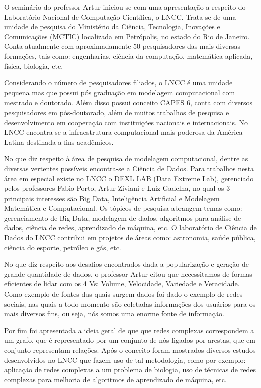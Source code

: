 \documentclass[
	12pt,				%
	openright,			%
	twoside,			%
	a4paper,			%
	english,			%
	brazil,				%
	svgnames
	]{abntex2}\usepackage[]{graphicx}\usepackage[]{color}
\begin{document}
O seminário do professor Artur iniciou-se com uma apresentação a respeito do Laboratório Nacional de Computação Científica, o LNCC. Trata-se de uma unidade de pesquisa do Ministério da Ciência, Tecnologia, Inovações e Comunicações (MCTIC) localizada em Petrópolis, no estado do Rio de Janeiro. Conta atualmente com aproximadamente 50 pesquisadores das mais diversas formações, tais como: engenharias, ciência da computação, matemática aplicada, física, biologia, etc.

Considerando o número de pesquisadores filiados, o LNCC é uma unidade pequena mas que possui pós graduação em modelagem computacional com mestrado e doutorado. Além disso possui conceito CAPES 6, conta com diversos pesquisadores em pós-doutorado, além de muitos trabalhos de pesquisa e desenvolvimento em cooperação com instituições nacionais e internacionais. No LNCC encontra-se a infraestrutura computacional mais poderosa da América Latina destinada a fins acadêmicos.

No que diz respeito à área de pesquisa de modelagem computacional, dentre as diversas vertentes possíveis encontra-se a Ciência de Dados. Para trabalhos nesta área em especial existe no LNCC o DEXL LAB (Data Extreme Lab), gerenciado pelos professores Fabio Porto, Artur Ziviani e Luiz Gadelha, no qual os 3 principais interesses são Big Data, Inteligência Artificial e Modelagem Matemática e Computacional. Os tópicos de pesquisa abrangem temas como: gerenciamento de Big Data, modelagem de dados, algoritmos para análise de dados, ciência de redes, aprendizado de máquina, etc. O laboratório de Ciência de Dados do LNCC contribui em projetos de áreas como: astronomia, saúde pública, ciência do esporte, petróleo e gás, etc.

No que diz respeito aos desafios encontrados dada a popularização e geração de grande quantidade de dados, o professor Artur citou que necessitamos de formas eficientes de lidar com os 4 Vs: Volume, Velocidade, Variedade e Veracidade. Como exemplo de fontes das quais surgem dados foi dado o exemplo de redes sociais, nas quais a todo momento são coletadas informações dos usuários para os mais diversos fins, ou seja, nós somos uma enorme fonte de informação.

Por fim foi apresentada a ideia geral de que que redes complexas correspondem a um grafo, que é representado por um conjunto de nós ligados por arestas, que em conjunto representam relações. Após o conceito foram mostrados diversos estudos desenvolvidos no LNCC que fazem uso de tal metodologia, como por exemplo: aplicação de redes complexas a um problema de biologia, uso de técnicas de redes complexas para melhoria de algoritmos de aprendizado de máquina, etc.
\end{document}
